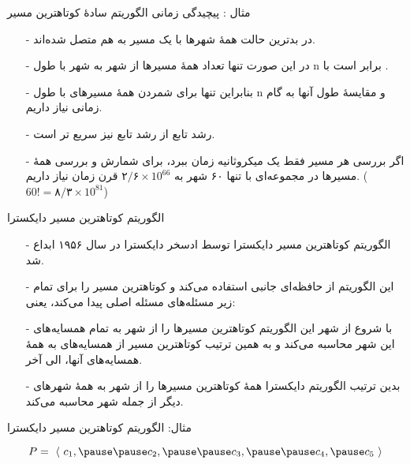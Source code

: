 \begin{frame}{مثال : پیچیدگی زمانی الگوریتم سادهٔ کوتاهترین مسیر}
\begin{itemize}\itmsep{5mm}
\item[-]
در بدترین حالت همهٔ شهرها با یک مسیر به هم متصل شده‌اند.
\item[-]
در این صورت تنها تعداد همهٔ مسیرها از شهر
به شهر
با طول n
برابر است با
.
\item[-]
بنابراین تنها برای شمردن همهٔ مسیرهای با طول n و مقایسهٔ طول آنها به
گام زمانی نیاز داریم.
\item[-]
رشد تابع
از رشد تابع
نیز سریع تر است.
\item[-]
اگر بررسی هر مسیر فقط یک میکروثانیه زمان ببرد، برای شمارش و بررسی همهٔ مسیرها در مجموعه‌ای با تنها ۶۰ شهر به 
$\text{۲/۶} \times 10^{66}$
قرن زمان نیاز داریم.
($60 ! = \text{۸/۳} \times 10^{81}$)
\end{itemize}
\end{frame}

\begin{frame}{الگوریتم کوتاهترین مسیر دایکسترا}
\begin{itemize}\itmsep{5mm}
\item[-] 
الگوریتم کوتاهترین مسیر دایکسترا توسط ادسخر دایکسترا
 در سال ۱۹۵۶ ابداع شد.
\item[-]
این الگوریتم از حافظه‌ای جانبی استفاده می‌کند و کوتاهترین مسیر را برای تمام زیر مسئله‌های مسئله اصلی پیدا می‌کند، یعنی:
\item[-]
با شروع از شهر 
 این الگوریتم کوتاهترین مسیرها را از شهر
 به تمام همسایه‌های این شهر محاسبه می‌کند و به همین ترتیب کوتاهترین مسیر از همسایه‌های
 به همهٔ همسایه‌های آنها، الی آخر.
\item[-]
بدین ترتیب الگوریتم دایکسترا همهٔ کوتاهترین مسیرها را از شهر
به همهٔ شهرهای دیگر از جمله شهر
محاسبه می‌کند.
\end{itemize}
\end{frame}

\begin{frame}{مثال: الگوریتم کوتاهترین مسیر دایکسترا}

\begin{figure}[!ht]
  \centering
  \label{fig:d1}
\end{figure}

\[
P =~\langle~c_1, \pause \pause c_2, \pause \pause c_3,\pause \pause 
c_4,  \pause c_5 ~\rangle
\]

\end{frame}


